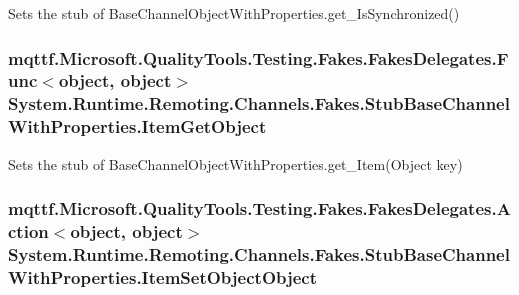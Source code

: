 Sets the stub of Base\-Channel\-Object\-With\-Properties.\-get\-\_\-\-Is\-Synchronized()

\hypertarget{class_system_1_1_runtime_1_1_remoting_1_1_channels_1_1_fakes_1_1_stub_base_channel_with_properties_a472ced9ac978667e0bf9bd88f108db5d}{
\subsubsection[{Item\-Get\-Object}]{\setlength{\rightskip}{0pt plus 5cm}mqttf.\-Microsoft.\-Quality\-Tools.\-Testing.\-Fakes.\-Fakes\-Delegates.\-Func$<$object, object$>$ System.\-Runtime.\-Remoting.\-Channels.\-Fakes.\-Stub\-Base\-Channel\-With\-Properties.\-Item\-Get\-Object}}\label{class_system_1_1_runtime_1_1_remoting_1_1_channels_1_1_fakes_1_1_stub_base_channel_with_properties_a472ced9ac978667e0bf9bd88f108db5d}


Sets the stub of Base\-Channel\-Object\-With\-Properties.\-get\-\_\-\-Item(\-Object key)

\hypertarget{class_system_1_1_runtime_1_1_remoting_1_1_channels_1_1_fakes_1_1_stub_base_channel_with_properties_a62bc9700dd3a7ec1307eb69db6e4750b}{
\subsubsection[{Item\-Set\-Object\-Object}]{\setlength{\rightskip}{0pt plus 5cm}mqttf.\-Microsoft.\-Quality\-Tools.\-Testing.\-Fakes.\-Fakes\-Delegates.\-Action$<$object, object$>$ System.\-Runtime.\-Remoting.\-Channels.\-Fakes.\-Stub\-Base\-Channel\-With\-Properties.\-Item\-Set\-Object\-Object}}\label{class_system_1_1_runtime_1_1_remoting_1_1_channels_1_1_fakes_1_1_stub_base_channel_with_properties_a62bc9700dd3a7ec1307eb69db6e4750b}


